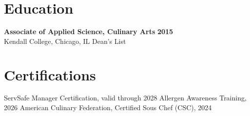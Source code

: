\documentclass[10pt,letterpaper]{article}
\newcommand{\education}[4]{%
  \textbf{#1} \hfill \textbf{#2}\\[-0.08em]
  #3 \hfill #4\par
}
\begin{document}
\section*{Education}
\education{Associate of Applied Science, Culinary Arts}{2015}{Kendall College, Chicago, IL}{Dean's List}

\section*{Certifications}
ServSafe Manager Certification, valid through 2028 \textbar{} Allergen Awareness Training, 2026 \textbar{} American Culinary Federation, Certified Sous Chef (CSC), 2024
\end{document}
